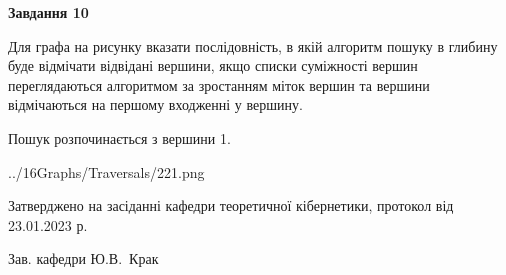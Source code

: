 \documentclass[12pt, ukrainian]{article}
\begin{document}
{\begin {large}
{\begin {center}\textbf{Завдання 10}\end {center}}\par
Для графа на рисунку вказати послідовність, в якій алгоритм пошуку в глибину буде відмічати відвідані вершини, якщо списки суміжності вершин переглядаються алгоритмом за зростанням міток вершин та вершини відмічаються на першому вход\-женні у вершину.\par
Пошук розпочинається з вершини 1.\par

\begin{center}
	{../16Graphs/Traversals/221.png}
\end{center}\par
\newpage


\end {large}
}
{\smallskip \begin {small} Затверджено на засіданні кафедри теоретичної кібернетики, протокол  від   23.01.2023 р.\par\smallskip\smallskip
{\parbox {6.5 cm}{Зав. кафедри \dotfill Ю.В.~Крак}} \end{small}}
\end{document}
